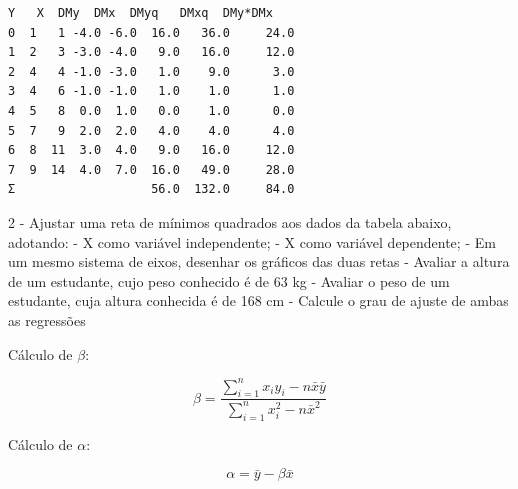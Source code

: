 \documentclass[11pt]{article}
\begin{document}
    
    \begin{Verbatim}[commandchars=\\\{\}]
   Y   X  DMy  DMx  DMyq   DMxq  DMy*DMx
0  1   1 -4.0 -6.0  16.0   36.0     24.0
1  2   3 -3.0 -4.0   9.0   16.0     12.0
2  4   4 -1.0 -3.0   1.0    9.0      3.0
3  4   6 -1.0 -1.0   1.0    1.0      1.0
4  5   8  0.0  1.0   0.0    1.0      0.0
5  7   9  2.0  2.0   4.0    4.0      4.0
6  8  11  3.0  4.0   9.0   16.0     12.0
7  9  14  4.0  7.0  16.0   49.0     28.0
Σ                   56.0  132.0     84.0
    \end{Verbatim}

    
    2 - Ajustar uma reta de mínimos quadrados aos dados da tabela abaixo,
adotando: - X como variável independente; - X como variável dependente;
- Em um mesmo sistema de eixos, desenhar os gráficos das duas retas -
Avaliar a altura de um estudante, cujo peso conhecido é de 63 kg -
Avaliar o peso de um estudante, cuja altura conhecida é de 168 cm -
Calcule o grau de ajuste de ambas as regressões

    Cálculo de \(\beta\):

\[
\beta =
\frac{\displaystyle\sum_{i=1}^{n} x_i y_i - n\bar{x}\bar{y}}
     {\displaystyle\sum_{i=1}^{n} x_i^2 - n\bar{x}^{2}}
\]

Cálculo de \(\alpha\):

\[
\alpha = \bar{y} - \beta\bar{x}
\]
\end{document}
